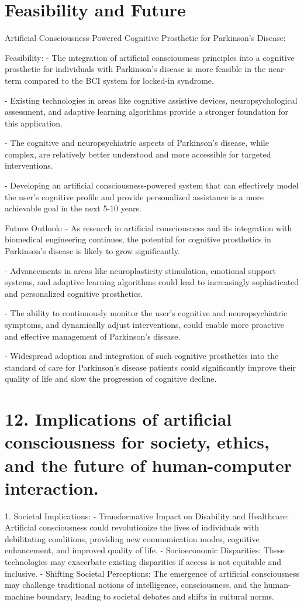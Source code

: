 \documentclass{article}
\begin{document}
\section*{Feasibility and Future}
Artificial Consciousness-Powered Cognitive Prosthetic for Parkinson's Disease:

Feasibility:
- The integration of artificial consciousness principles into a cognitive prosthetic for individuals with Parkinson's disease is more feasible in the near-term compared to the BCI system for locked-in syndrome.

- Existing technologies in areas like cognitive assistive devices, neuropsychological assessment, and adaptive learning algorithms provide a stronger foundation for this application.

- The cognitive and neuropsychiatric aspects of Parkinson's disease, while complex, are relatively better understood and more accessible for targeted interventions.

- Developing an artificial consciousness-powered system that can effectively model the user's cognitive profile and provide personalized assistance is a more achievable goal in the next 5-10 years.

Future Outlook:
- As research in artificial consciousness and its integration with biomedical engineering continues, the potential for cognitive prosthetics in Parkinson's disease is likely to grow significantly.

- Advancements in areas like neuroplasticity stimulation, emotional support systems, and adaptive learning algorithms could lead to increasingly sophisticated and personalized cognitive prosthetics.

- The ability to continuously monitor the user's cognitive and neuropsychiatric symptoms, and dynamically adjust interventions, could enable more proactive and effective management of Parkinson's disease.

- Widespread adoption and integration of such cognitive prosthetics into the standard of care for Parkinson's disease patients could significantly improve their quality of life and slow the progression of cognitive decline.


\section *{12. Implications of artificial consciousness for society, ethics, and the future of human-computer interaction.}
1. Societal Implications:
   - Transformative Impact on Disability and Healthcare: Artificial consciousness could revolutionize the lives of individuals with debilitating conditions, providing new communication modes, cognitive enhancement, and improved quality of life.
   - Socioeconomic Disparities: These technologies may exacerbate existing disparities if access is not equitable and inclusive.
   - Shifting Societal Perceptions: The emergence of artificial consciousness may challenge traditional notions of intelligence, consciousness, and the human-machine boundary, leading to societal debates and shifts in cultural norms.
\end{document}
